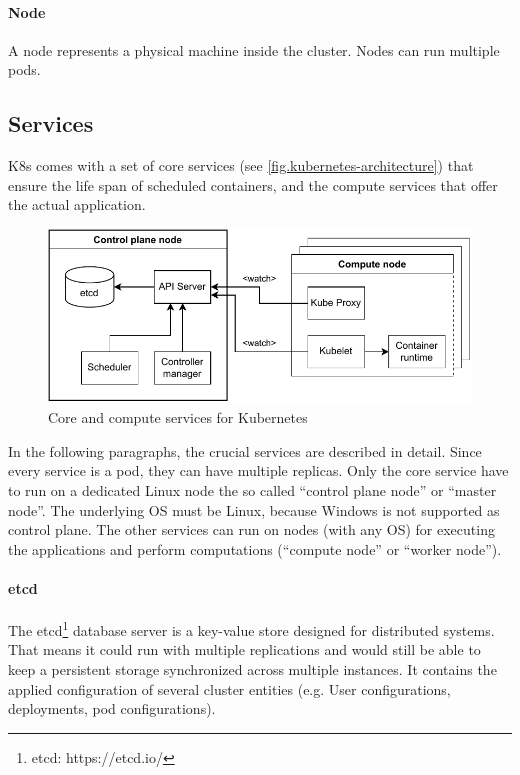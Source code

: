 \paragraph*{Node} A node represents a physical machine inside the cluster. Nodes can run multiple pods.


\subsection{Services}
\ac{K8s} comes with a set of core services (see \autoref{fig.kubernetes-architecture}) that ensure the life span of scheduled containers, and the compute services that offer the actual application.
\begin{figure}[h]
	\centering
	\includegraphics[width=.95\textwidth]{Figures/kubernetes-architecture.pdf}
	\caption{Core and compute services for Kubernetes\cite{Luksa.2018}}
	\label{fig.kubernetes-architecture}
\end{figure}

In the following paragraphs, the crucial services are described in detail. Since every service is a pod, they can have multiple replicas. Only the core service have to run on a dedicated Linux node the so called \enquote{control plane node} or \enquote{master node}. The underlying \ac{OS} must be Linux, because \ac{Windows} is not supported as control plane. The other services can run on nodes (with any \ac{OS}) for executing the applications and perform computations (\enquote{compute node} or \enquote{worker node}).

\paragraph*{etcd}
The etcd\footnote{etcd: https://etcd.io/} database server is a key-value store designed for distributed systems\cite{Luksa.2018}. That means it could run with multiple replications and would still be able to keep a persistent storage synchronized across multiple instances. It contains the applied configuration of several cluster entities (e.g. User configurations, deployments, pod configurations).

